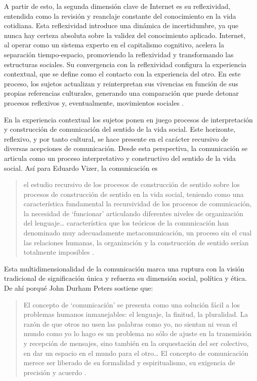 \documentclass[
  spanish,
  11pt,
  a4paper,
]{scrbook}
\begin{document}
A partir de esto, la segunda dimensión clave de Internet es su
reflexividad, entendida como la revisión y reanclaje constante del
conocimiento en la vida cotidiana. Esta reflexividad introduce una
dinámica de incertidumbre, ya que nunca hay certeza absoluta sobre la
validez del conocimiento aplicado. Internet, al operar como un sistema
experto en el capitalismo cognitivo, acelera la separación
tiempo-espacio, promoviendo la reflexividad y transformando las
estructuras sociales. Su convergencia con la reflexividad configura la
experiencia contextual, que se define como el contacto con la
experiencia del otro. En este proceso, los sujetos actualizan y
reinterpretan sus vivencias en función de sus propias referencias
culturales, generando una comparación que puede detonar procesos
reflexivos y, eventualmente, movimientos sociales
\autocite[124-125]{Padilla2004}.

En la experiencia contextual los sujetos ponen en juego procesos de
interpretación y construcción de comunicación del sentido de la vida
social. Este horizonte, reflexivo, y por tanto cultural, se hace
presente en el carácter recursivo de diversas acepciones de
comunicación. Desde esta perspectiva, la comunicación se articula como
un proceso interpretativo y constructivo del sentido de la vida social.
Así para Eduardo Vizer, la comunicación es

\begin{quote}
el estudio recursivo de los procesos de construcción de sentido sobre
los procesos de construcción de sentido en la vida social, teniendo como
una característica fundamental la recursividad de los procesos de
comunicación, la necesidad de `funcionar' articulando diferentes niveles
de organización del lenguaje\ldots{} característica que los teóricos de
la comunicación han denominado muy adecuadamente metacomunicación, un
proceso sin el cual las relaciones humanas, la organización y la
construcción de sentido serían totalmente imposibles
\autocite[571]{Vizer2018}.
\end{quote}

Esta multidimensionalidad de la comunicación marca una ruptura con la
visión tradicional de significación única y refuerza su dimensión
social, política y ética. De ahí porqué John Durham Peters sostiene que:

\begin{quote}
El concepto de `comunicación' se presenta como una solución fácil a los
problemas humanos inmanejables: el lenguaje, la finitud, la pluralidad.
La razón de que otros no usen las palabras como yo, no sientan ni vean
el mundo como yo lo hago es un problema no sólo de ajuste en la
transmisión y recepción de mensajes, sino también en la orquestación del
ser colectivo, en dar un espacio en el mundo para el otro\ldots{} El
concepto de comunicación merece ser liberado de su formalidad y
espiritualismo, su exigencia de precisión y acuerdo
\autocite[52-53]{DurhamPeters2014}.
\end{quote}
\end{document}
